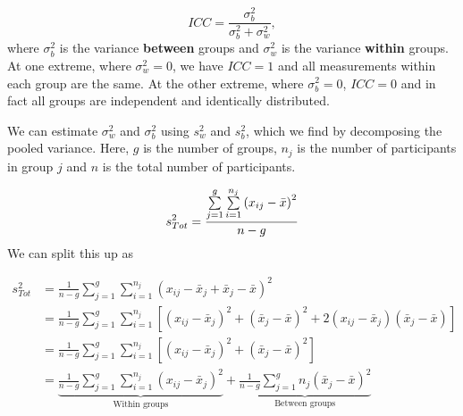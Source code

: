 \documentclass[
  openany]{book}
\theoremstyle{definition}
\theoremstyle{definition}
\theoremstyle{definition}
\theoremstyle{definition}
\theoremstyle{remark}
\begin{document}
\[ICC = \frac{\sigma^2_b}{\sigma^2_b + \sigma^2_w}, \]
where \(\sigma^2_b\) is the variance \textbf{between} groups and \(\sigma^2_w\) is the variance \textbf{within} groups. At one extreme, where \(\sigma_w^2=0\), we have \(ICC=1\) and all measurements within each group are the same. At the other extreme, where \(\sigma^2_b=0\), \(ICC=0\) and in fact all groups are independent and identically distributed.

We can estimate \(\sigma_w^2\) and \(\sigma_b^2\) using \(s_w^2\) and \(s_b^2\), which we find by decomposing the pooled variance. Here, \(g\) is the number of groups, \(n_j\) is the number of participants in group \(j\) and \(n\) is the total number of participants.

\[
s^2_{Tot} =  \frac{\sum\limits_{j=1}^g \sum\limits_{i=1}^{n_j}\left(x_{ij}-\bar{x}\right)^2}{n-g}\\
\]
We can split this up as

\[
\begin{aligned}
s^2_{Tot} & = \frac{1}{n-g}\sum\limits_{j=1}^g \sum\limits_{i=1}^{n_j}\left(x_{ij} - \bar{x}_j + \bar{x}_j-\bar{x}\right)^2\\
& = \frac{1}{n-g}\sum\limits_{j=1}^g \sum\limits_{i=1}^{n_j}\left[\left(x_{ij} - \bar{x}_j\right)^2 + \left(\bar{x}_j-\bar{x}\right)^2 + 2\left(x_{ij} - \bar{x}_j\right)\left(\bar{x}_j-\bar{x}\right)\right]\\
& = \frac{1}{n-g}\sum\limits_{j=1}^g \sum\limits_{i=1}^{n_j}\left[\left(x_{ij} - \bar{x}_j\right)^2 + \left(\bar{x}_j-\bar{x}\right)^2 \right]\\
&= \underbrace{\frac{1}{n-g}\sum\limits_{j=1}^g \sum\limits_{i=1}^{n_j}\left(x_{ij} - \bar{x}_j\right)^2}_{\text{Within groups}} + \underbrace{\frac{1}{n-g}\sum\limits_{j=1}^g n_j\left(\bar{x}_j - \bar{x}\right)^2}_{\text{Between groups}}
\end{aligned}
\]
\end{document}
